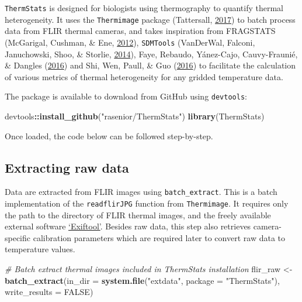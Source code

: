 \documentclass[12pt,british,a4paper,]{article}
\newenvironment{Shaded}{\begin{snugshade}}{\end{snugshade}}
\newcommand{\CommentTok}[1]{\textcolor[rgb]{0.56,0.35,0.01}{\textit{#1}}}
\newcommand{\DataTypeTok}[1]{\textcolor[rgb]{0.13,0.29,0.53}{#1}}
\newcommand{\KeywordTok}[1]{\textcolor[rgb]{0.13,0.29,0.53}{\textbf{#1}}}
\newcommand{\NormalTok}[1]{#1}
\newcommand{\OperatorTok}[1]{\textcolor[rgb]{0.81,0.36,0.00}{\textbf{#1}}}
\newcommand{\OtherTok}[1]{\textcolor[rgb]{0.56,0.35,0.01}{#1}}
\newcommand{\StringTok}[1]{\textcolor[rgb]{0.31,0.60,0.02}{#1}}
\begin{document}
\texttt{ThermStats} is designed for biologists using thermography to quantify thermal heterogeneity. It uses the \texttt{Thermimage} package (Tattersall, \protect\hyperlink{ref-tattersall_thermimage:_2017}{2017}) to batch process data from FLIR thermal cameras, and takes inspiration from FRAGSTATS (McGarigal, Cushman, \& Ene, \protect\hyperlink{ref-fragstats_2012}{2012}), \texttt{SDMTools} (VanDerWal, Falconi, Januchowski, Shoo, \& Storlie, \protect\hyperlink{ref-sdmtools_2014}{2014}), Faye, Rebaudo, Yánez-Cajo, Cauvy-Fraunié, \& Dangles (\protect\hyperlink{ref-faye_toolbox_2016}{2016}) and Shi, Wen, Paull, \& Guo (\protect\hyperlink{ref-shi_framework_2016}{2016}) to facilitate the calculation of various metrics of thermal heterogeneity for any gridded temperature data.

The package is available to download from GitHub using \texttt{devtools}:

\begin{Shaded}
\begin{Highlighting}[]
\NormalTok{devtools}\OperatorTok{::}\KeywordTok{install_github}\NormalTok{(}\StringTok{"rasenior/ThermStats"}\NormalTok{)}
\KeywordTok{library}\NormalTok{(ThermStats)}
\end{Highlighting}
\end{Shaded}

Once loaded, the code below can be followed step-by-step.

\hypertarget{extracting-raw-data}{%
\subsection{Extracting raw data}\label{extracting-raw-data}}

Data are extracted from FLIR images using \texttt{batch\_extract}. This is a batch implementation of the \texttt{readflirJPG} function from \texttt{Thermimage}. It requires only the path to the directory of FLIR thermal images, and the freely available external software \href{https://www.sno.phy.queensu.ca/~phil/exiftool/}{`Exiftool'}. Besides raw data, this step also retrieves camera-specific calibration parameters which are required later to convert raw data to temperature values.

\begin{Shaded}
\begin{Highlighting}[]
\CommentTok{# Batch extract thermal images included in ThermStats installation}
\NormalTok{flir_raw <-}
\StringTok{    }\KeywordTok{batch_extract}\NormalTok{(}\DataTypeTok{in_dir =} \KeywordTok{system.file}\NormalTok{(}\StringTok{"extdata"}\NormalTok{, }
                                       \DataTypeTok{package =} \StringTok{"ThermStats"}\NormalTok{),}
                  \DataTypeTok{write_results =} \OtherTok{FALSE}\NormalTok{)}
\end{Highlighting}
\end{Shaded}
\end{document}
